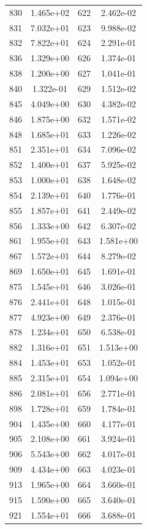 \documentclass[12pt]{article}
\begin{document}
\begin{longtable}{@{}cccc@{}}
830 & 1.465e+02 & 622 & 2.462e-02 \\
831 & 7.032e+01 & 623 & 9.988e-02 \\
832 & 7.822e+01 & 624 & 2.291e-01 \\
836 & 1.329e+00 & 626 & 1.374e-01 \\
838 & 1.200e+00 & 627 & 1.041e-01 \\
840 & 1.322e-01 & 629 & 1.512e-02 \\
845 & 4.049e+00 & 630 & 4.382e-02 \\
846 & 1.875e+00 & 632 & 1.571e-02 \\
848 & 1.685e+01 & 633 & 1.226e-02 \\
851 & 2.351e+01 & 634 & 7.096e-02 \\
852 & 1.400e+01 & 637 & 5.925e-02 \\
853 & 1.000e+01 & 638 & 1.648e-02 \\
854 & 2.139e+01 & 640 & 1.776e-01 \\
855 & 1.857e+01 & 641 & 2.449e-02 \\
856 & 1.333e+00 & 642 & 6.307e-02 \\
861 & 1.955e+01 & 643 & 1.581e+00 \\
867 & 1.572e+01 & 644 & 8.279e-02 \\
869 & 1.650e+01 & 645 & 1.691e-01 \\
875 & 1.545e+01 & 646 & 3.026e-01 \\
876 & 2.441e+01 & 648 & 1.015e-01 \\
877 & 4.923e+00 & 649 & 2.376e-01 \\
878 & 1.234e+01 & 650 & 6.538e-01 \\
882 & 1.316e+01 & 651 & 1.513e+00 \\
884 & 1.453e+01 & 653 & 1.052e-01 \\
885 & 2.315e+01 & 654 & 1.094e+00 \\
886 & 2.081e+01 & 656 & 2.771e-01 \\
898 & 1.728e+01 & 659 & 1.784e-01 \\
904 & 1.435e+00 & 660 & 4.177e-01 \\
905 & 2.108e+00 & 661 & 3.924e-01 \\
906 & 5.543e+00 & 662 & 4.017e-01 \\
909 & 4.434e+00 & 663 & 4.023e-01 \\
913 & 1.965e+00 & 664 & 3.660e-01 \\
915 & 1.590e+00 & 665 & 3.640e-01 \\
921 & 1.554e+01 & 666 & 3.688e-01 \\

\end{longtable}
\end{document}
